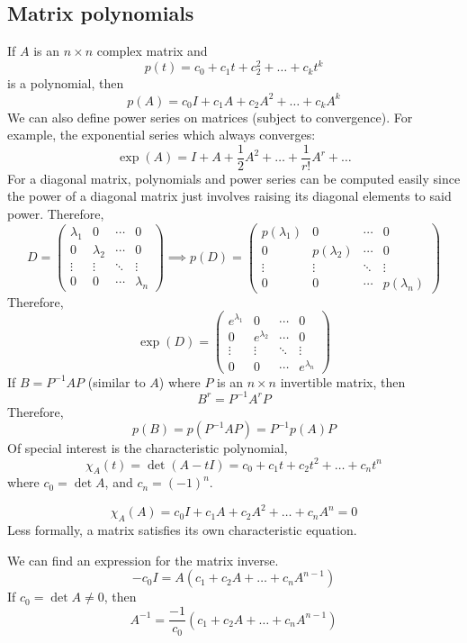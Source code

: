 \subsection{Matrix polynomials}
If \(A\) is an \(n \times n\) complex matrix and
\[
	p(t) = c_0 + c_1t + c_2^2 + \dots + c_k t^k
\]
is a polynomial, then
\[
	p(A) = c_0I + c_1A + c_2A^2 + \dots + c_k A^k
\]
We can also define power series on matrices (subject to convergence).
For example, the exponential series which always converges:
\[
	\exp(A) = I + A + \frac{1}{2}A^2 + \dots + \frac{1}{r!}A^r + \dots
\]
For a diagonal matrix, polynomials and power series can be computed easily since the power of a diagonal matrix just involves raising its diagonal elements to said power.
Therefore,
\[
	D = \begin{pmatrix}
		\lambda_1 & 0         & \cdots & 0         \\
		0         & \lambda_2 & \cdots & 0         \\
		\vdots    & \vdots    & \ddots & \vdots    \\
		0         & 0         & \cdots & \lambda_n
	\end{pmatrix} \implies p(D) = \begin{pmatrix}
		p(\lambda_1) & 0            & \cdots & 0            \\
		0            & p(\lambda_2) & \cdots & 0            \\
		\vdots       & \vdots       & \ddots & \vdots       \\
		0            & 0            & \cdots & p(\lambda_n)
	\end{pmatrix}
\]
Therefore,
\[
	\exp(D) = \begin{pmatrix}
		e^{\lambda_1} & 0             & \cdots & 0             \\
		0             & e^{\lambda_2} & \cdots & 0             \\
		\vdots        & \vdots        & \ddots & \vdots        \\
		0             & 0             & \cdots & e^{\lambda_n}
	\end{pmatrix}
\]
If \(B = P^{-1}AP\) (similar to \(A\)) where \(P\) is an \(n \times n\) invertible matrix, then
\[
	B^r = P^{-1}A^r P
\]
Therefore,
\[
	p(B) = p(P^{-1}AP) = P^{-1}p(A)P
\]
Of special interest is the characteristic polynomial,
\[
	\chi_A(t) = \det(A - tI) = c_0 + c_1t + c_2t^2 + \dots + c_n t^n
\]
where \(c_0 = \det A\), and \(c_n = (-1)^n\).
\begin{theorem}
	\[
		\chi_A(A) = c_0I + c_1A + c_2A^2 + \dots + c_n A^n = 0
	\]
	Less formally, a matrix satisfies its own characteristic equation.
\end{theorem}
\begin{remark}
	We can find an expression for the matrix inverse.
	\[
		-c_0I = A(c_1 + c_2A + \dots + c_n A^{n-1})
	\]
	If \(c_0 = \det A \neq 0\), then
	\[
		A^{-1} = \frac{-1}{c_0}(c_1 + c_2A + \dots + c_n A^{n-1})
	\]
\end{remark}

